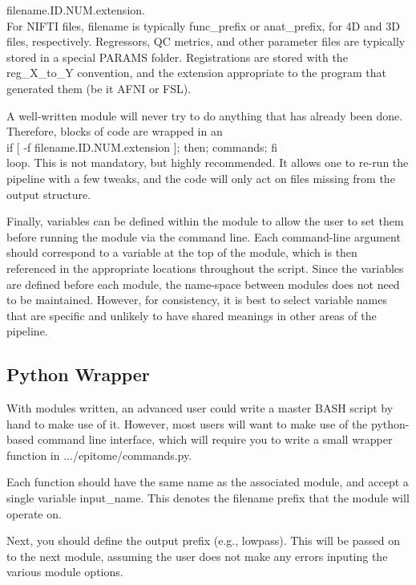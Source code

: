 \documentclass[final,titlepage,letterpaper,oneside,12pt]{article}
\renewcommand{\texttt}[2][BrickRed]{\textcolor{#1}{\ttfamily #2}}%
\begin{document}
\texttt{filename.ID.NUM.extension}. \\

For NIFTI files, \texttt{filename} is typically \texttt{func\_prefix} or \texttt{anat\_prefix}, for 4D and 3D files, respectively. Regressors, QC metrics, and other parameter files are typically stored in a special \texttt{PARAMS} folder. Registrations are stored with the \texttt{reg\_X\_to\_Y} convention, and the extension appropriate to the program that generated them (be it AFNI or FSL).

A well-written module will never try to do anything that has already been done. Therefore, blocks of code are wrapped in an \\

\texttt{if [ -f filename.ID.NUM.extension ]; then; commands; fi} \\

\noindent 
loop. This is not mandatory, but highly recommended. It allows one to re-run the pipeline with a few tweaks, and the code will only act on files missing from the output structure. 

Finally, variables can be defined within the module to allow the user to set them before running the module via the command line. Each command-line argument should correspond to a variable at the top of the module, which is then referenced in the appropriate locations throughout the script. Since the variables are defined before each module, the name-space between modules does not need to be maintained. However, for consistency, it is best to select variable names that are specific and unlikely to have shared meanings in other areas of the pipeline. 

\subsection{Python Wrapper}

With modules written, an advanced user could write a master BASH script by hand to make use of it. However, most users will want to make use of the python-based command line interface, which will require you to write a small wrapper function in \texttt{.../epitome/commands.py}.

Each function should have the same name as the associated module, and accept a single variable \texttt{input\_name}. This denotes the filename prefix that the module will operate on.

Next, you should define the output prefix (e.g., \texttt{lowpass}). This will be passed on to the next module, assuming the user does not make any errors inputing the various module options.
\end{document}
